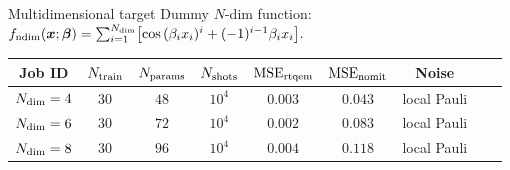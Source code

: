 \documentclass[8pt, xcolor={svgnames}, hyperref={linkcolor=black}]{beamer}
\begin{document}
\begin{frame}{Multidimensional target}
Dummy $N$-dim function: $ f_{\rm ndim}(\bm{x}; \bm{\beta}) = \sum_{i=1}^{N_{\rm dim}} \bigl[ \cos{(\beta_i x_i)^{i}} + 
(-1)^{i-1} \beta_i x_i \bigr]. $
\begin{center}
\footnotesize
\begin{tabular}{ccccccccc}
\hline \hline 
\rule{0pt}{2.5ex}
\textbf{Job ID} & $N_{\rm train}$ & $N_{\rm params}$ & $N_{\rm shots}$ 
& $\text{MSE}_{\rm rtqem}$ &  $\text{MSE}_{\rm nomit}$ & Noise \\
\hline
$N_{\rm dim}=4$ & $30$ & $48$ & $10^{4}$ &  $0.003$ & $0.043$ & local Pauli \\
$N_{\rm dim}=6$ & $30$ & $72$ & $10^{4}$ &  $0.002$ & $0.083$ & local Pauli \\
$N_{\rm dim}=8$ & $30$ & $96$ & $10^{4}$ &  $0.004$ & $0.118$ & local Pauli \\
\hline \hline 
\end{tabular}
\end{center}


\end{frame}
\end{document}
